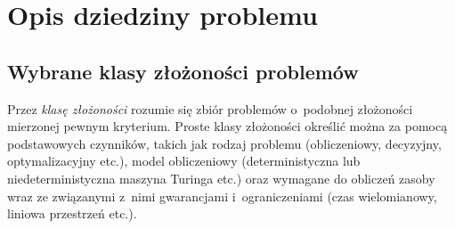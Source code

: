 \section{Opis dziedziny problemu}\label{Section_Domain}
\subsection{Wybrane klasy złożoności problemów}\label{subsection_p_np}
\par{
  Przez \emph{klasę złożoności} rozumie się zbiór problemów o~podobnej złożoności mierzonej pewnym kryterium. 
  Proste klasy złożoności określić można za pomocą podstawowych czynników, takich jak rodzaj problemu (obliczeniowy, decyzyjny, optymalizacyjny etc.), model  obliczeniowy (deterministyczna lub niedeterministyczna maszyna Turinga etc.)
  oraz wymagane do obliczeń zasoby wraz ze związanymi z~nimi gwarancjami i~ograniczeniami (czas wielomianowy, liniowa przestrzeń etc.).
}

